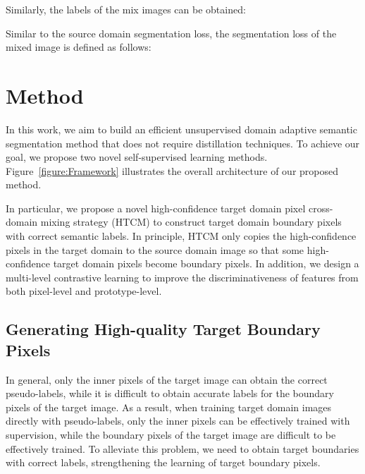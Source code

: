 \documentclass[sigconf]{acmart}
\begin{document}
		Similarly, the labels of the mix images can be obtained:
		
		Similar to the source domain segmentation loss, the segmentation loss of the mixed image is defined as follows:
		
		
		
		\section{Method}
		\label{method}
		In this work, we aim to build an efficient unsupervised domain adaptive semantic segmentation method that does not require distillation techniques. To achieve our goal, we propose two novel self-supervised learning methods. 
		Figure~\ref{figure:Framework}
		illustrates the overall architecture of our proposed method.
		
		In particular, we propose a novel high-confidence target domain pixel cross-domain mixing strategy (HTCM) to construct target domain boundary pixels with correct semantic labels. In principle, HTCM only copies the high-confidence pixels in the target domain to the source domain image so that some high-confidence target domain pixels become boundary pixels. In addition, we design a multi-level contrastive learning to improve the discriminativeness of features from both pixel-level and prototype-level.
		\subsection{Generating High-quality Target Boundary Pixels}
		
		In general, only the inner pixels of the target image can obtain the correct pseudo-labels, while it is difficult to obtain accurate labels for the boundary pixels of the target image. As a result, when training target domain images directly with pseudo-labels, only the inner pixels can be effectively trained with supervision, while the boundary pixels of the target image are difficult to be effectively trained. To alleviate this problem, we need to obtain target boundaries with correct labels, strengthening the learning of target boundary pixels.
		
		
		
\end{document}
